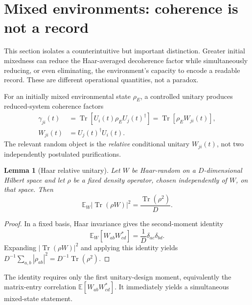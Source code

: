 \documentclass[aps,pra,reprint,superscriptaddress,nofootinbib,longbibliography]{revtex4-2}
\newtheorem{lemma}{Lemma}
\newcommand{\Tr}{\operatorname{Tr}}
\newcommand{\E}{\mathbb{E}}
\begin{document}
\section{Mixed environments: coherence is not a record}
\label{sec:mixed}

This section isolates a counterintuitive but important distinction.  Greater
initial mixedness can reduce the Haar-averaged decoherence factor while
simultaneously reducing, or even eliminating, the environment's capacity to
encode a readable record.  These are different operational quantities, not a
paradox.

For an initially mixed environmental state $\rho_E$, a controlled unitary
produces reduced-system coherence factors
\begin{equation}
\begin{aligned}
 \gamma_{ji}(t)
 &=\Tr\!\left[U_i(t)\rho_EU_j(t)^\dagger\right]
 =\Tr\!\left[\rho_E W_{ji}(t)\right],
 \\
 W_{ji}(t)&=U_j(t)^\dagger U_i(t).
 \label{eq:mixedgamma}
\end{aligned}
\end{equation}
The relevant random object is the \emph{relative} conditional unitary
$W_{ji}(t)$, not two independently postulated purifications.

\begin{lemma}[Haar relative unitary]
\label{lem:mixed}
Let $W$ be Haar-random on a $D$-dimensional Hilbert space and let $\rho$ be a
fixed density operator, chosen independently of $W$, on that space.  Then
\begin{equation}
 \E_W|\Tr(\rho W)|^2=\frac{\Tr(\rho^2)}{D}.
 \label{eq:mixedhaar}
\end{equation}
\end{lemma}

\begin{proof}
In a fixed basis, Haar invariance gives the second-moment identity
\begin{equation}
 \E_W[W_{ab}W_{cd}^*]=\frac{1}{D}\delta_{ac}\delta_{bd}.
\end{equation}
Expanding $|\Tr(\rho W)|^2$ and applying this identity yields
$D^{-1}\sum_{a,b}|\rho_{ab}|^2=D^{-1}\Tr(\rho^2)$.
\end{proof}

The identity requires only the first unitary-design moment, equivalently the
matrix-entry correlation $\E[W_{ab}W_{cd}^*]$.  It immediately yields a
simultaneous mixed-state statement.
\end{document}
